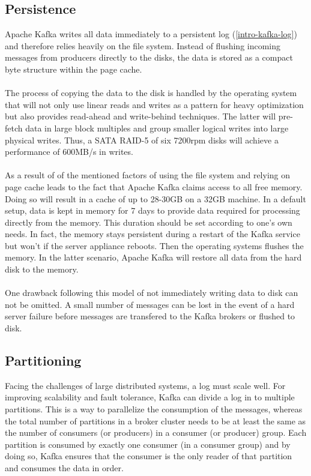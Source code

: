 \subsection{Persistence}
\label{kafka-persistence}
Apache Kafka writes all data immediately to a persistent log
(\ref{intro-kafka-log}) 
and therefore relies heavily on the \gls{file system}.
Instead of flushing incoming messages from producers directly to the disks, the
data is stored as a compact byte structure within the \gls{page cache}.
\\ \\
The process of copying the data to the disk is handled by the operating system
that will not only use linear reads and writes  as a pattern for heavy
optimization but also provides read-ahead and write-behind techniques.
The latter will pre-fetch data in large block multiples and group smaller logical
writes into large physical writes. Thus, a SATA RAID-5 of six 7200rpm
disks will achieve a performance of 600MB/s in writes.
\\ \\
As a result of of the mentioned factors of using the file system and relying on
\gls{page cache} leads to the fact that Apache Kafka claims access to all free memory.
Doing so will result in a cache of up to 28-30GB on a 32GB machine. In a default
setup, data is kept in memory for 7 days to provide data required for processing
directly from the memory. This duration should be set according to one's own
needs. In fact, the memory stays persistent during a restart of the Kafka
service but won't if the server appliance reboots. Then the operating systems
flushes the memory. In the latter scenario, Apache Kafka will restore all data
from the hard disk to the memory.
\cite{apachekafka} \\ \\
One drawback following this model of not immediately writing data to disk can not be
omitted. A small number of messages can be lost in the event of a hard server
failure before messages are transfered to the Kafka brokers or flushed to disk.
\cite{goodhope2012building}

\subsection{Partitioning}
\label{kafka-partitioning}
Facing the challenges of large distributed systems, a log must scale well. For
improving scalability and fault tolerance, Kafka can divide a log in to multiple
partitions. This is a way to parallelize the consumption of the messages, whereas
the total number of partitions in a broker cluster needs to be at least the same
as the number of consumers (or producers) in a consumer (or producer) group.
Each partition is consumed by exactly one consumer (in a consumer group) and by
doing so, Kafka ensures that the consumer is the only reader of that partition
and consumes the data in order.

